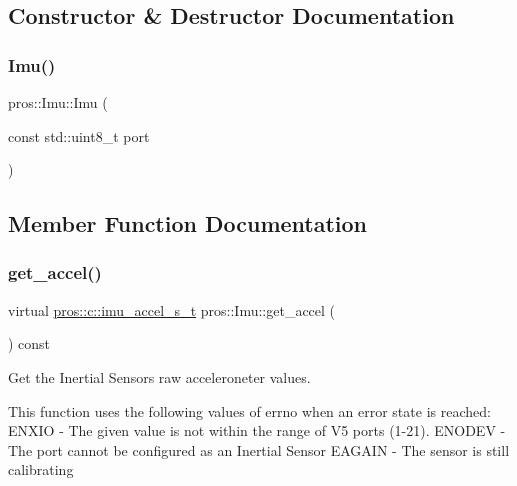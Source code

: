 \subsection{Constructor \& Destructor Documentation}
\mbox{\label{classpros_1_1Imu_aac194322ec0563c1c73f540733e7cc4e}} 
\subsubsection{\texorpdfstring{Imu()}{Imu()}}
{\footnotesize\ttfamily pros\+::\+Imu\+::\+Imu (\begin{DoxyParamCaption}\item[{const std\+::uint8\+\_\+t}]{port }\end{DoxyParamCaption})\hspace{0.3cm}{\ttfamily [inline]}}



\subsection{Member Function Documentation}
\mbox{\label{classpros_1_1Imu_ac9a047f46e7ae8d73a6189091df20150}} 
\subsubsection{\texorpdfstring{get\+\_\+accel()}{get\_accel()}}
{\footnotesize\ttfamily virtual \hyperlink{imu_8h_a70eb3173193f4f46266eade4c243f662}{pros\+::c\+::imu\+\_\+accel\+\_\+s\+\_\+t} pros\+::\+Imu\+::get\+\_\+accel (\begin{DoxyParamCaption}{ }\end{DoxyParamCaption}) const\hspace{0.3cm}{\ttfamily [virtual]}}



Get the Inertial Sensor\textquotesingle{}s raw acceleroneter values. 

This function uses the following values of errno when an error state is reached\+: E\+N\+X\+IO -\/ The given value is not within the range of V5 ports (1-\/21). E\+N\+O\+D\+EV -\/ The port cannot be configured as an Inertial Sensor E\+A\+G\+A\+IN -\/ The sensor is still calibrating



